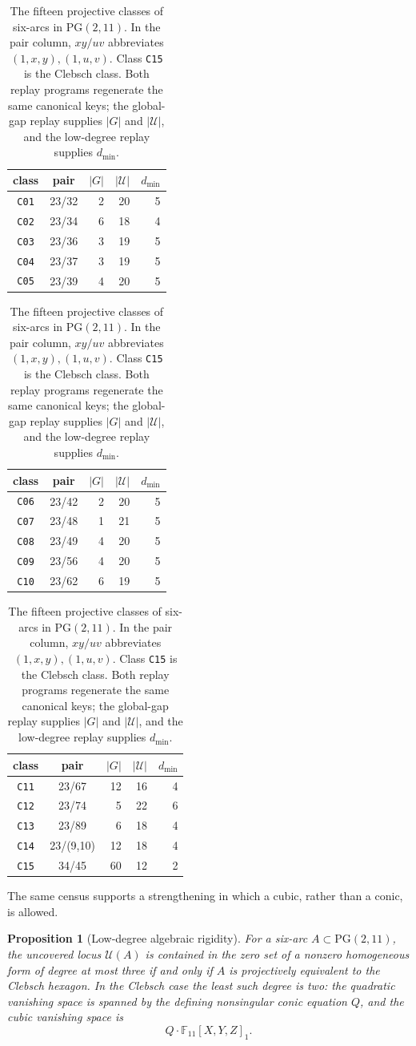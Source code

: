 \documentclass[11pt]{article}
\newtheorem{proposition}[theorem]{Proposition}
\theoremstyle{remark}
\newcommand{\PG}{\mathrm{PG}}
\newcommand{\F}{\mathbb{F}}
\newcommand{\cU}{\mathcal{U}}
\begin{document}
\begin{table}[H]
\centering
\scriptsize
\begin{tabular}{@{}c c r r r@{}}
\toprule
class & pair & $|G|$ & $|\cU|$ & $d_{\min}$\\
\midrule
\texttt{C01}&23/32& 2&20&5\\
\texttt{C02}&23/34& 6&18&4\\
\texttt{C03}&23/36& 3&19&5\\
\texttt{C04}&23/37& 3&19&5\\
\texttt{C05}&23/39& 4&20&5\\
\bottomrule
\end{tabular}
\hfill
\begin{tabular}{@{}c c r r r@{}}
\toprule
class & pair & $|G|$ & $|\cU|$ & $d_{\min}$\\
\midrule
\texttt{C06}&23/42& 2&20&5\\
\texttt{C07}&23/48& 1&21&5\\
\texttt{C08}&23/49& 4&20&5\\
\texttt{C09}&23/56& 4&20&5\\
\texttt{C10}&23/62& 6&19&5\\
\bottomrule
\end{tabular}
\hfill
\begin{tabular}{@{}c c r r r@{}}
\toprule
class & pair & $|G|$ & $|\cU|$ & $d_{\min}$\\
\midrule
\texttt{C11}&23/67&12&16&4\\
\texttt{C12}&23/74& 5&22&6\\
\texttt{C13}&23/89& 6&18&4\\
\texttt{C14}&23/(9,10)&12&18&4\\
\texttt{C15}&34/45&60&12&2\\
\bottomrule
\end{tabular}
\caption{The fifteen projective classes of six-arcs in $\PG(2,11)$.
In the pair column, \(xy/uv\) abbreviates
\((1,x,y),(1,u,v)\).
Class \texttt{C15} is the Clebsch class.  Both replay programs regenerate
the same canonical keys; the global-gap replay supplies $|G|$ and
$|\cU|$, and the low-degree replay supplies $d_{\min}$.}
\label{tab:fifteen-classes}
\end{table}

The same census supports a strengthening in which a cubic, rather than a
conic, is allowed.

\begin{proposition}[Low-degree algebraic rigidity]
\label{prop:low-degree-rigidity}
For a six-arc $A\subset\PG(2,11)$, the uncovered locus $\cU(A)$ is
contained in the zero set of a nonzero homogeneous form of degree at most
three if and only if $A$ is projectively equivalent to the Clebsch
hexagon. In the Clebsch case the least such degree is two: the quadratic
vanishing space is spanned by the defining nonsingular conic equation $Q$,
and the cubic vanishing space is
\[
 Q\cdot\F_{11}[X,Y,Z]_1.
\]
\end{proposition}
\end{document}

